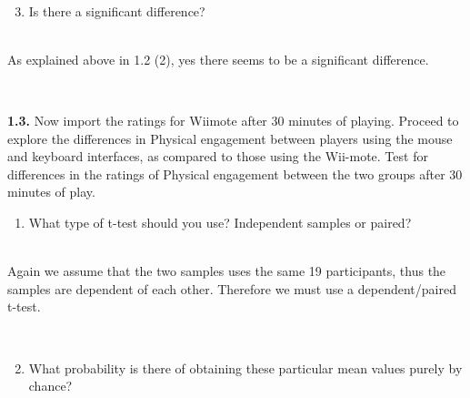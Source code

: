 \hspace{0pt} \\
\noindent\colorbox{lighter-gray}{\begin{minipage}{0.98\textwidth}
\begin{enumerate}[label=\textbf{(\arabic*)}]\setcounter{enumi}{2}
	\item Is there a significant difference?
\end{enumerate}\end{minipage}}

\hspace{0pt} \\
As explained above in 1.2 (2), yes there seems to be a significant difference.

\hspace{0pt} \\
\noindent\colorbox{light-gray}{\begin{minipage}{0.98\textwidth}
\textbf{1.3.} Now import the ratings for Wiimote after 30 minutes of playing. Proceed to explore the differences in Physical engagement between players using the mouse and keyboard interfaces, as compared to those using the Wii-mote. Test for differences in the ratings of Physical engagement between the two groups after 30 minutes of play.
\end{minipage}}

\noindent\colorbox{lighter-gray}{\begin{minipage}{0.98\textwidth}
\begin{enumerate}[label=\textbf{(\arabic*)}]\setcounter{enumi}{0}
	\item What type of t-test should you use? Independent samples or paired?
\end{enumerate}\end{minipage}}

\hspace{0pt} \\
Again we assume that the two samples uses the same 19 participants, thus the samples are dependent of each other. Therefore we must use a dependent/paired t-test.

\hspace{0pt} \\
\noindent\colorbox{lighter-gray}{\begin{minipage}{0.98\textwidth}
\begin{enumerate}[label=\textbf{(\arabic*)}]\setcounter{enumi}{1}
	\item What probability is there of obtaining these particular mean values purely by chance?
\end{enumerate}\end{minipage}}

